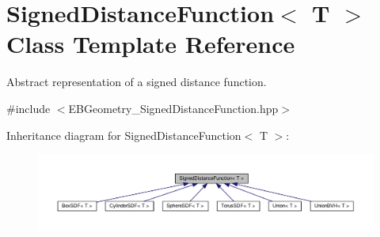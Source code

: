 \hypertarget{classSignedDistanceFunction}{}\section{Signed\+Distance\+Function$<$ T $>$ Class Template Reference}
\label{classSignedDistanceFunction}


Abstract representation of a signed distance function.  




{\ttfamily \#include $<$E\+B\+Geometry\+\_\+\+Signed\+Distance\+Function.\+hpp$>$}



Inheritance diagram for Signed\+Distance\+Function$<$ T $>$\+:
\nopagebreak
\begin{figure}[H]
\begin{center}
\leavevmode
\includegraphics[width=350pt]{classSignedDistanceFunction__inherit__graph}
\end{center}
\end{figure}
